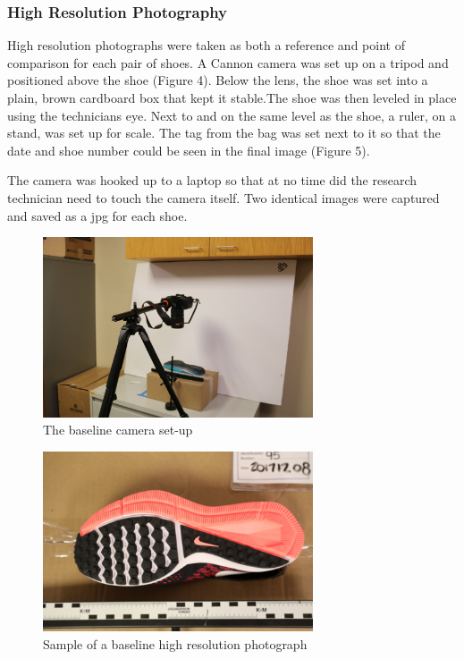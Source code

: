 \newpage 

\subsubsection{High Resolution Photography}
 High resolution photographs were taken as both a reference and point of comparison for each pair of shoes. A Cannon camera was set up on a tripod and positioned above the shoe (Figure 4). Below the lens, the shoe was set into a plain, brown cardboard box that kept it stable.The shoe was then leveled in place using the technicians eye. Next to and on the same level as the shoe, a ruler, on a stand, was set up for scale. The tag from the bag was set next to it so that the date and shoe number could be seen in the final image (Figure 5). 
   
   The camera was hooked up to a laptop so that at no time did the research technician need to touch the camera itself. Two identical images were captured and saved as a jpg for each shoe. 

\begin{figure}[!htp]
\centering
\includegraphics[width=8cm]{Original_Camera_Set}
\caption{The baseline camera set-up }
\label{Image 4}
\end{figure}

\begin{figure}[!htp]
\centering
\includegraphics[width=8cm]{Baseline_Photo}
\caption{Sample of a baseline high resolution photograph}
\label{Image 5}
\end{figure}


